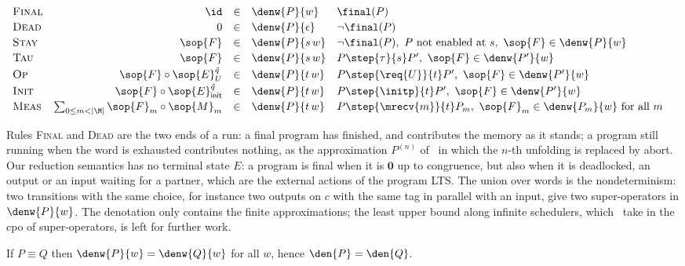\begin{table}[h]
\centering
\footnotesize
$\begin{array}{l@{\quad}rcl@{\quad}l}
\textsc{Final} & \id &\in& \denw{P}{w} & \final(P) \\[2pt]
\textsc{Dead} & 0 &\in& \denw{P}{\epsilon} & \neg\final(P) \\[2pt]
\textsc{Stay} & \sop{F} &\in& \denw{P}{s\,w}
  & \neg\final(P),\ P \text{ not enabled at } s,\ \sop{F} \in \denw{P}{w} \\[2pt]
\textsc{Tau} & \sop{F} &\in& \denw{P}{s\,w}
  & P \step{\tau}{s} P',\ \sop{F} \in \denw{P'}{w} \\[2pt]
\textsc{Op} & \sop{F} \circ \sop{E}_U^{\tilde q} &\in& \denw{P}{t\,w}
  & P \step{\req{U}}{t} P',\ \sop{F} \in \denw{P'}{w} \\[2pt]
\textsc{Init} & \sop{F} \circ \sop{E}_{\mathsf{init}}^{\tilde q} &\in& \denw{P}{t\,w}
  & P \step{\initp}{t} P',\ \sop{F} \in \denw{P'}{w} \\[2pt]
\textsc{Meas} & \sum_{0 \le m < |\M|} \sop{F}_m \circ \sop{M}_m &\in& \denw{P}{t\,w}
  & P \step{\mrecv{m}}{t} P_m,\ \sop{F}_m \in \denw{P_m}{w} \text{ for all } m
\end{array}$
\caption{Denotation of a program under a word of choices.}
\label{tab:den}
\end{table}

\begin{remark}
Rules \textsc{Final} and \textsc{Dead} are the two ends of a run: a final
program has finished, and contributes the memory as it stands; a program still
running when the word is exhausted contributes nothing, as the approximation
$P^{(n)}$ of~\cite{UVY26} in which the $n$-th unfolding is replaced by abort.
Our reduction semantics has no terminal state $E$: a program is final when it
is $\mathbf{0}$ up to congruence, but also when it is deadlocked, an output or
an input waiting for a partner, which are the external actions of the program
LTS. The union over words is the nondeterminism: two transitions with the
same choice, for instance two outputs on $c$ with the same tag in parallel
with an input, give two super-operators in $\denw{P}{w}$. The denotation only
contains the finite approximations; the least upper bound along infinite
schedulers, which~\cite{FengXu23,UVY26} take in the cpo of super-operators,
is left for further work.
\end{remark}

\begin{lemma}[Congruence]\label{lem:den-cgr}
If $P \equiv Q$ then $\denw{P}{w} = \denw{Q}{w}$ for all $w$, hence
$\den{P} = \den{Q}$.
\end{lemma}

